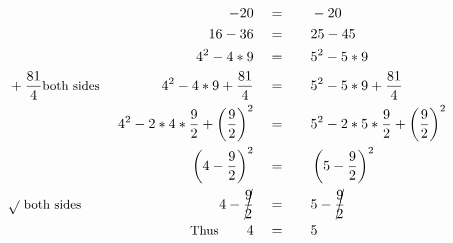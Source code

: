 \begin{alignat*}{5}
&\,&-20\quad&=\quad&&-20\\
&\,&16-36\quad&=&&25-45\\
&\,&4^2-4*9\quad&=&&5^2-5*9\\
&\small+\frac{81}{4}\text{both sides }&4^2-4*9+\frac{81}{4}\quad&=&&5^2-5*9+\frac{81}{4}\\
&\,&4^2-2*4*\frac{9}{2}+\left(\frac{9}{2}\right)^2\quad&=&&5^2-2*5*\frac{9}{2}+ \left(\frac{9}{2}\right)^2\\
&\,&\left(4-\frac{9}{2}\right)^2\quad&=&&\left(5-\frac{9}{2}\right)^2\\
&\small\sqrt{}~\text{both sides }&4-\cancel{\frac{9}{2}}\quad&=&&5-\cancel{\frac{9}{2}}\\
&\,&\small\text{Thus}\normalsize\qquad4\quad&=&&5
\end{alignat*}
